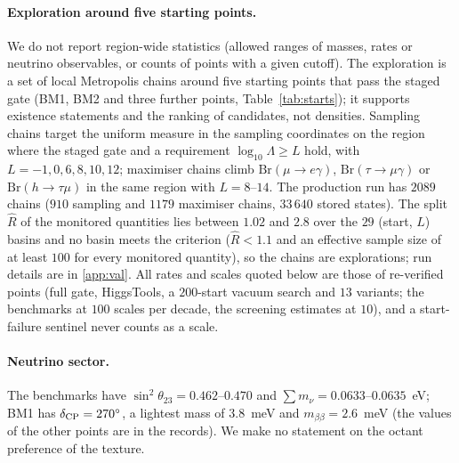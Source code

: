 \documentclass[twocolumn,epjc3]{svjour3}
\newcommand{\Br}{\mathrm{Br}}
\begin{document}
\paragraph{Exploration around five starting points.} We do not report region-wide statistics (allowed ranges of masses, rates or neutrino observables, or counts of points with a given cutoff). The exploration is a set of local Metropolis chains around five starting points that pass the staged gate (BM1, BM2 and three further points, Table~\ref{tab:starts}); it supports existence statements and the ranking of candidates, not densities. Sampling chains target the uniform measure in the sampling coordinates on the region where the staged gate and a requirement $\log_{10}\Lambda\ge L$ hold, with $L=-1,0,6,8,10,12$; maximiser chains climb $\Br(\mu\to e\gamma)$, $\Br(\tau\to\mu\gamma)$ or $\Br(h\to\tau\mu)$ in the same region with $L=8$--$14$. The production run has $2089$ chains ($910$ sampling and $1179$ maximiser chains, $33\,640$ stored states). The split $\hat R$ of the monitored quantities lies between $1.02$ and $2.8$ over the $29$ (start, $L$) basins and no basin meets the criterion ($\hat R<1.1$ and an effective sample size of at least $100$ for every monitored quantity), so the chains are explorations; run details are in \ref{app:val}. All rates and scales quoted below are those of re-verified points (full gate, HiggsTools, a $200$-start vacuum search and $13$ variants; the benchmarks at $100$ scales per decade, the screening estimates at $10$), and a start-failure sentinel never counts as a scale.

\paragraph{Neutrino sector.} The benchmarks have $\sin^2\theta_{23}=0.462$--$0.470$ and $\sum m_\nu=0.0633$--$0.0635$~eV; BM1 has $\delta_{\rm CP}=270^\circ$, a lightest mass of $3.8$~meV and $m_{\beta\beta}=2.6$~meV (the values of the other points are in the records). We make no statement on the octant preference of the texture.
\end{document}
